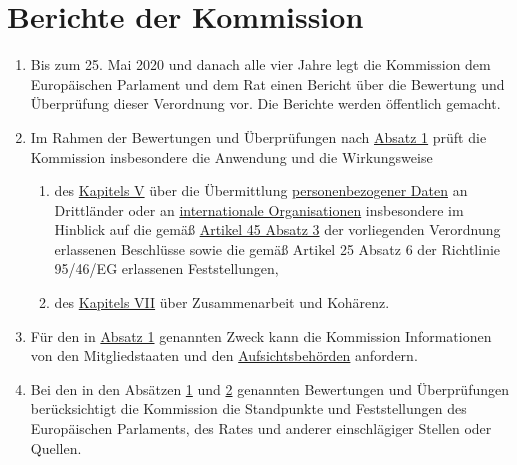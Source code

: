 \chapter{Berichte der Kommission}
\label{ch:97}


\begin{enumerate}

  \item Bis zum 25. Mai 2020 und danach alle vier Jahre legt die Kommission dem Europäischen Parlament und dem Rat einen
   Bericht über die Bewertung und Überprüfung dieser Verordnung vor. Die Berichte werden öffentlich gemacht.%
  \label{itm:97-1}

  \item Im Rahmen der Bewertungen und Überprüfungen nach \hyperref[itm:97-1]{Absatz 1} prüft die Kommission insbesondere
   die Anwendung und die Wirkungsweise%
  \label{itm:97-2}

  \begin{enumerate}
  
    \item des \hyperref[part:5]{Kapitels V} über die Übermittlung \hyperref[itm:04-1]{personenbezogener Daten} an
     Drittländer oder an \hyperref[itm:04-26]{internationale Organisationen} insbesondere im Hinblick auf die
     gemäß \hyperref[itm:45-3]{Artikel 45 Absatz 3} der vorliegenden Verordnung erlassenen Beschlüsse sowie die gemäß
     Artikel 25 Absatz 6 der Richtlinie 95/46/EG erlassenen Feststellungen,%
    \label{itm:97-2a}

    \item des \hyperref[part:7]{Kapitels VII} über Zusammenarbeit und Kohärenz.%
    \label{itm:97-2b}

  \end{enumerate}

  \item Für den in \hyperref[itm:97-1]{Absatz 1} genannten Zweck kann die Kommission Informationen von den
   Mitgliedstaaten und den \hyperref[itm:04-21]{Aufsichtsbehörden} anfordern.%
  \label{itm:97-3}

  \item Bei den in den Absätzen \hyperref[itm:97-1]{1} und \hyperref[itm:97-2]{2} genannten Bewertungen und
   Überprüfungen berücksichtigt die Kommission die Standpunkte und Feststellungen des Europäischen Parlaments, des
   Rates und anderer einschlägiger Stellen oder Quellen.%
  \label{itm:97-4}


\end{enumerate}
